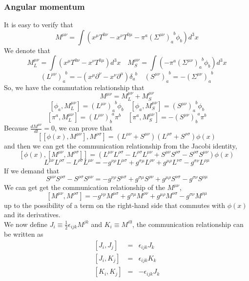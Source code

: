 \documentclass{article}
\begin{document}
\subsubsection{Angular momentum}
It is easy to verify that
\[M^{\mu \nu} = \int (x^{\mu}T^{0\nu}-x^{\nu}T^{0\mu}-\pi^a(\Sigma^{\mu \nu})_{a}^{\phantom{a}b}\phi_b) d^3 x\]
We denote that
\[M_{L}^{\mu \nu} = \int (x^{\mu}T^{0\nu}-x^{\nu}T^{0\mu}) d^3 x \quad M_S^{\mu \nu} = \int (-\pi^a(\Sigma^{\mu \nu})_{a}^{\phantom{a}b}\phi_b) d^3 x\]
\[(L^{\mu \nu})_a^{\phantom{a}b} = -(x^{\mu}\partial^{\nu}-x^{\nu}\partial^{\mu})\delta_a^{\phantom{a}b} \quad (S^{\mu \nu})_a^{\phantom{a}b} = -(\Sigma^{\mu \nu})_a^{\phantom{a}b}\]
So, we have the commutation relationship that
\[M^{\mu \nu} = M_L^{\mu \nu} + M_S^{\mu \nu}\]
\[[\phi_a,M_L^{\mu \nu}] = (L^{\mu \nu})_a^{\phantom{a}b} \phi_b \quad [\phi_a,M_S^{\mu \nu}] = (S^{\mu \nu})_a^{\phantom{a}b} \phi_b\]
\[[\pi^a,M_L^{\mu \nu}] = (L^{\mu \nu})_b^{\phantom{b}a}\pi^{b}  \quad [\pi^a,M_S^{\mu \nu}] = - (S^{\mu \nu})_b^{\phantom{b}a} \pi^b \]
Because $\frac{d M^{\mu \nu}}{dt} = 0$, we can prove that
\[[[\phi(x),M^{\mu \nu}],M^{\rho \sigma}] = (L^{\mu \nu}+S^{\mu \nu})(L^{\rho \sigma}+S^{\rho \sigma})\phi(x)\]
and then we can get the communication relationship from the Jacobi identity,
\[[\phi(x),[M^{\mu \nu},M^{\rho \sigma}]] = (L^{\mu \nu}L^{\rho \sigma}-L^{\rho \sigma}L^{\mu \nu} + S^{\mu \nu}S^{\rho \sigma}-S^{\rho \sigma}S^{\mu \nu})\phi(x)\]
\[L^{\mu \nu}L^{\rho \sigma}-L^{\rho \sigma}L^{\mu \nu} = -g^{\nu \rho}L^{\mu \sigma} + g^{\sigma \mu}L^{\rho \nu} + g^{\mu \rho}L^{\nu \sigma} - g^{\sigma \nu}L^{\rho \mu}\]
If we demand that
\[S^{\mu \nu}S^{\rho \sigma}-S^{\rho \sigma}S^{\mu \nu} = -g^{\nu \rho}S^{\mu \sigma} + g^{\sigma \mu}S^{\rho \nu} + g^{\mu \rho}S^{\nu \sigma} - g^{\sigma \nu}S^{\rho \mu}\]
We can get get the communication relationship of the $M^{\mu \nu}$,
\[[M^{\mu \nu},M^{\rho \sigma}] = -g^{\nu \rho}M^{\mu \sigma} + g^{\sigma \mu}M^{\rho \nu} + g^{\mu \rho}M^{\nu \sigma} - g^{\sigma \nu}M^{\rho \mu}\]
up to the possibility of a term on the right-hand side that commutes with $\phi(x)$ and its derivatives.\\
We now define $J_i \equiv \frac{1}{2} \epsilon_{ijk} M^{jk}$ and $K_i \equiv M^{i0}$, the communication relationship can be written as
\begin{eqnarray}
\left[J_i,J_j\right] &=& \epsilon_{ijk}J_k \nonumber \\
\left[J_i,K_j\right] &=& \epsilon_{ijk}K_k \nonumber \\
\left[K_i,K_j\right] &=& -\epsilon_{ijk}J_k \nonumber
\end{eqnarray}
\end{document}
